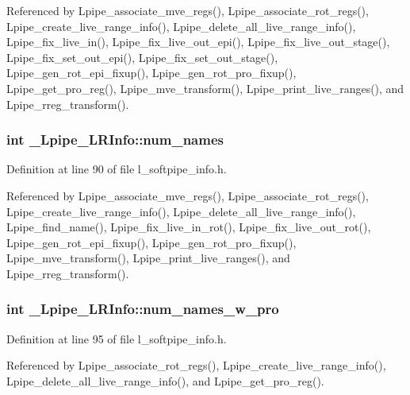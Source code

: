 Referenced by Lpipe\_\-associate\_\-mve\_\-regs(), Lpipe\_\-associate\_\-rot\_\-regs(), Lpipe\_\-create\_\-live\_\-range\_\-info(), Lpipe\_\-delete\_\-all\_\-live\_\-range\_\-info(), Lpipe\_\-fix\_\-live\_\-in(), Lpipe\_\-fix\_\-live\_\-out\_\-epi(), Lpipe\_\-fix\_\-live\_\-out\_\-stage(), Lpipe\_\-fix\_\-set\_\-out\_\-epi(), Lpipe\_\-fix\_\-set\_\-out\_\-stage(), Lpipe\_\-gen\_\-rot\_\-epi\_\-fixup(), Lpipe\_\-gen\_\-rot\_\-pro\_\-fixup(), Lpipe\_\-get\_\-pro\_\-reg(), Lpipe\_\-mve\_\-transform(), Lpipe\_\-print\_\-live\_\-ranges(), and Lpipe\_\-rreg\_\-transform().
\subsubsection{\setlength{\rightskip}{0pt plus 5cm}int \bf{\_\-Lpipe\_\-LRInfo::num\_\-names}}\label{struct__Lpipe__LRInfo_db15a0e8e7d797feaa48a78b14fc0ffc}




Definition at line 90 of file l\_\-softpipe\_\-info.h.

Referenced by Lpipe\_\-associate\_\-mve\_\-regs(), Lpipe\_\-associate\_\-rot\_\-regs(), Lpipe\_\-create\_\-live\_\-range\_\-info(), Lpipe\_\-delete\_\-all\_\-live\_\-range\_\-info(), Lpipe\_\-find\_\-name(), Lpipe\_\-fix\_\-live\_\-in\_\-rot(), Lpipe\_\-fix\_\-live\_\-out\_\-rot(), Lpipe\_\-gen\_\-rot\_\-epi\_\-fixup(), Lpipe\_\-gen\_\-rot\_\-pro\_\-fixup(), Lpipe\_\-mve\_\-transform(), Lpipe\_\-print\_\-live\_\-ranges(), and Lpipe\_\-rreg\_\-transform().
\subsubsection{\setlength{\rightskip}{0pt plus 5cm}int \bf{\_\-Lpipe\_\-LRInfo::num\_\-names\_\-w\_\-pro}}\label{struct__Lpipe__LRInfo_60ccf00fa2c17a8f6cf454ecc7c66fa4}




Definition at line 95 of file l\_\-softpipe\_\-info.h.

Referenced by Lpipe\_\-associate\_\-rot\_\-regs(), Lpipe\_\-create\_\-live\_\-range\_\-info(), Lpipe\_\-delete\_\-all\_\-live\_\-range\_\-info(), and Lpipe\_\-get\_\-pro\_\-reg().
